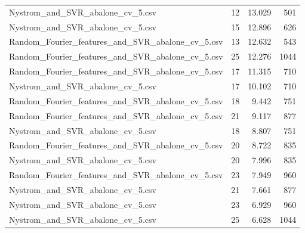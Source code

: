 \begin{tabularx}{\textwidth}{lrrr}
                Nystrom\_and\_SVR\_abalone\_cv\_5.csv &       12 &   13.029 &           501 \\
                Nystrom\_and\_SVR\_abalone\_cv\_5.csv &       15 &   12.896 &           626 \\
Random\_Fourier\_features\_and\_SVR\_abalone\_cv\_5.csv &       13 &   12.632 &           543 \\
Random\_Fourier\_features\_and\_SVR\_abalone\_cv\_5.csv &       25 &   12.276 &          1044 \\
Random\_Fourier\_features\_and\_SVR\_abalone\_cv\_5.csv &       17 &   11.315 &           710 \\
                Nystrom\_and\_SVR\_abalone\_cv\_5.csv &       17 &   10.102 &           710 \\
Random\_Fourier\_features\_and\_SVR\_abalone\_cv\_5.csv &       18 &    9.442 &           751 \\
Random\_Fourier\_features\_and\_SVR\_abalone\_cv\_5.csv &       21 &    9.117 &           877 \\
                Nystrom\_and\_SVR\_abalone\_cv\_5.csv &       18 &    8.807 &           751 \\
Random\_Fourier\_features\_and\_SVR\_abalone\_cv\_5.csv &       20 &    8.722 &           835 \\
                Nystrom\_and\_SVR\_abalone\_cv\_5.csv &       20 &    7.996 &           835 \\
Random\_Fourier\_features\_and\_SVR\_abalone\_cv\_5.csv &       23 &    7.949 &           960 \\
                Nystrom\_and\_SVR\_abalone\_cv\_5.csv &       21 &    7.661 &           877 \\
                Nystrom\_and\_SVR\_abalone\_cv\_5.csv &       23 &    6.929 &           960 \\
                Nystrom\_and\_SVR\_abalone\_cv\_5.csv &       25 &    6.628 &          1044 \\
\bottomrule
\end{tabularx}
